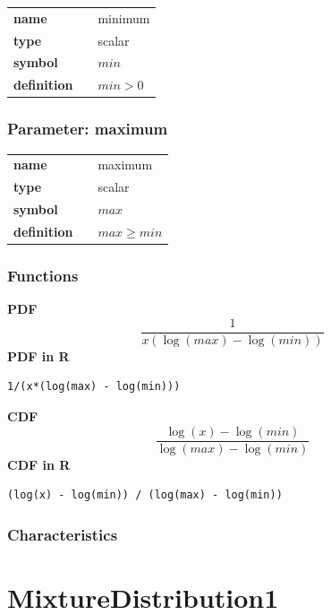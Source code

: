 \noindent\begin{tabular}{p{2cm}cl}
\textbf{name} & & minimum \\
\textbf{type} & & scalar \\
\textbf{symbol} & & $min$  \\
\textbf{definition} & & $min>0$
\end{tabular}
\subsubsection*{Parameter: maximum}

\noindent\begin{tabular}{p{2cm}cl}
\textbf{name} & & maximum \\
\textbf{type} & & scalar \\
\textbf{symbol} & & $max$  \\
\textbf{definition} & & $max \geq min$
\end{tabular}
\subsubsection*{Functions}

\smallskip \noindent \hspace{.2cm} \textbf{PDF} 
\begin{equation*}\frac{1}{x(\log(max) - \log(min))}\end{equation*}
\smallskip \noindent \hspace{.2cm} \textbf{PDF in R}  
\begin{verbatim}1/(x*(log(max) - log(min)))\end{verbatim}
\smallskip \noindent \hspace{.2cm} \textbf{CDF} 
\begin{equation*}\frac{\log(x) - \log(min)}{\log(max) - \log(min)}\end{equation*}
\smallskip \noindent \hspace{.2cm} \textbf{CDF in R} 
\begin{verbatim}(log(x) - log(min)) / (log(max) - log(min))\end{verbatim}
\smallskip
\subsubsection*{Characteristics}
\smallskip
\section*{MixtureDistribution1} 

